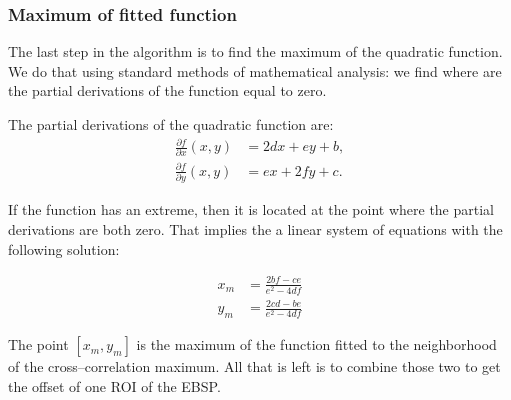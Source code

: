 \subsubsection{Maximum of fitted function}

The last step in the algorithm is to find the maximum of the quadratic function. We do that using standard methods of mathematical analysis: we find where are the partial derivations of the function equal to zero.

The partial derivations of the quadratic function are:
\begin{align*}
\frac{\partial f}{\partial x}(x,y) &= 2dx + ey + b,\\
\frac{\partial f}{\partial y}(x,y) &= ex + 2fy + c.
\end{align*}

If the function has an extreme, then it is located at the point where the partial derivations are both zero. That implies the a linear system of equations with the following solution:

\begin{align*}
x_m &= \frac{2bf - ce}{e^2 - 4df}\\
y_m &= \frac{2cd - be}{e^2 - 4df}
\end{align*}

The point $[x_m, y_m]$ is the maximum of the function fitted to the neighborhood of the cross--correlation maximum. All that is left is to combine those two to get the offset of one ROI of the EBSP.
